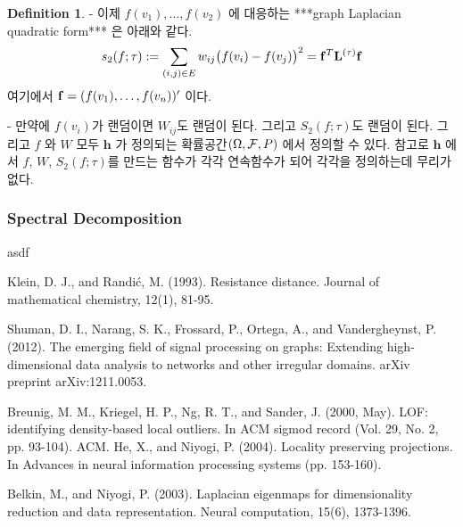 \documentclass[preprint, review, 12pt]{article}
\theoremstyle{definition}
\newtheorem{dfn}{Definition}
\theoremstyle{remark}
\begin{document}
\begin{dfn}
- 이제 $f(v_1),\dots,f(v_2)$ 에 대응하는 ***graph Laplacian quadratic form*** 은 아래와 같다. 
\begin{align}
s_2(f;\tau):=\sum_{(i,j)\in E} w_{ij} \big(f(v_i)-f(v_j)\big)^2={\bf f}^T {\bf L}^{(\tau)}{\bf f}
\end{align}
여기에서 ${\bf f}=(f(v_1),\dots,f(v_n))'$ 이다. 

- 만약에 $f(v_i)$가 랜덤이면 $W_{ij}$도 랜덤이 된다. 그리고 $S_2(f;\tau)$도 랜덤이 된다. 그리고 $f$ 와 $W$ 모두 ${\boldsymbol h}$ 가 정의되는 확률공간$(\Omega,{\cal F},P)$ 에서 정의할 수 있다. 참고로 ${\boldsymbol h}$ 에서 $f$, $W$, $S_2(f;\tau)$를 만드는 함수가 각각 연속함수가 되어 각각을 정의하는데 무리가 없다. 

\subsubsection*{Spectral Decomposition}
asdf




\begin{thebibliography}{}



Klein, D. J., and Randić, M. (1993). Resistance distance. Journal of mathematical chemistry, 12(1), 81-95.

 Shuman, D. I., Narang, S. K., Frossard, P., Ortega, A., and Vandergheynst, P. (2012). The emerging field of signal processing on graphs: Extending high-dimensional data analysis to networks and other irregular domains. arXiv preprint arXiv:1211.0053.

 Breunig, M. M., Kriegel, H. P., Ng, R. T., and Sander, J. (2000, May). LOF: identifying density-based local outliers. In ACM sigmod record (Vol. 29, No. 2, pp. 93-104). ACM.
 He, X., and Niyogi, P. (2004). Locality preserving projections. In Advances in neural information processing systems (pp. 153-160).

 Belkin, M., and Niyogi, P. (2003). Laplacian eigenmaps for dimensionality reduction and data representation. Neural computation, 15(6), 1373-1396.


\end{thebibliography}
\end{dfn}
\end{document}
